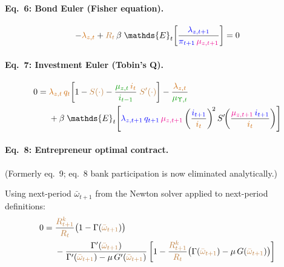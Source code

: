\documentclass[11pt]{article}
\begin{document}
\paragraph{Eq.~6: Bond Euler (Fisher equation).}
\begin{equation}
  -\textcolor{orange!80!black}{\lambda_{z,t}}
  + \textcolor{brown}{R_t}\,\beta\;\mathds{E}_t\!\left[
    \frac{\textcolor{blue}{\lambda_{z,t+1}}}
      {\textcolor{blue}{\pi_{t+1}}\,\textcolor{magenta}{\mu_{z,t+1}}}
  \right] = 0
\end{equation}

\paragraph{Eq.~7: Investment Euler (Tobin's Q).}
\begin{equation}
  \begin{split}
  0 = {}&
    \textcolor{orange!80!black}{\lambda_{z,t}}\,\textcolor{orange!80!black}{q_t}\!\left[
      1 - \textcolor{brown}{S(\cdot)}
      - \frac{\textcolor{green!60!black}{\mu_{z,t}}\,\textcolor{orange!80!black}{i_t}}
        {\textcolor{green!60!black}{i_{t-1}}}\;\textcolor{brown}{S'(\cdot)}
    \right]
    - \frac{\textcolor{orange!80!black}{\lambda_{z,t}}}{\textcolor{green!60!black}{\mu_{\Upsilon,t}}}
  \\
    &+ \beta\;\mathds{E}_t\!\left[
      \textcolor{blue}{\lambda_{z,t+1}}\,\textcolor{blue}{q_{t+1}}\,\textcolor{magenta}{\mu_{z,t+1}}
      \left(\frac{\textcolor{blue}{i_{t+1}}}{\textcolor{orange!80!black}{i_t}}\right)^{\!2}
      S'\!\!\left(\frac{\textcolor{magenta}{\mu_{z,t+1}}\,\textcolor{blue}{i_{t+1}}}
        {\textcolor{orange!80!black}{i_t}}\right)
    \right]
  \end{split}
\end{equation}

\paragraph{Eq.~8: Entrepreneur optimal contract.}
(Formerly eq.~9; eq.~8 bank participation is now eliminated analytically.)

Using next-period $\bar\omega_{t+1}$ from the Newton solver applied to next-period definitions:
\begin{equation}
  \begin{split}
  0 ={}&
    \frac{\textcolor{brown}{R_{t+1}^k}}{\textcolor{brown}{R_t}}
    \bigl(1 - \Gamma(\textcolor{brown}{\bar\omega_{t+1}})\bigr)
  \\
    &-\frac{\Gamma'(\textcolor{brown}{\bar\omega_{t+1}})}
      {\Gamma'(\textcolor{brown}{\bar\omega_{t+1}}) - \mu\,G'(\textcolor{brown}{\bar\omega_{t+1}})}
    \left[
      1 - \frac{\textcolor{brown}{R_{t+1}^k}}{\textcolor{brown}{R_t}}
      \bigl(\Gamma(\textcolor{brown}{\bar\omega_{t+1}}) - \mu\,G(\textcolor{brown}{\bar\omega_{t+1}})\bigr)
    \right]
  \end{split}
\end{equation}
\end{document}
